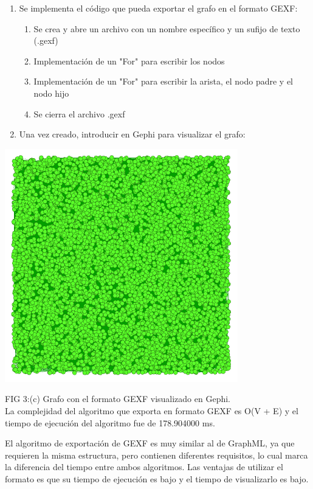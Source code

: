 \documentclass[book, 16 pt, conference]{ieeeconf}
\begin{document}
\begin{enumerate}
\item Se implementa el código que pueda exportar el grafo en el formato GEXF:
	\begin{enumerate}
	\item Se crea y abre un archivo con un nombre específico y un sufijo de texto (.gexf)
	\item Implementación de un "For" para escribir los nodos
	\item Implementación de un "For" para escribir la arista, el nodo padre y el nodo hijo
	\item Se cierra el archivo .gexf
	\end{enumerate}
\item Una vez creado, introducir en Gephi para visualizar el grafo: \\
\end{enumerate} 

\begin{center}
\includegraphics[scale=0.40]{3} 
\end{center}
FIG 3:(c) Grafo con el formato GEXF visualizado en Gephi.\\

La complejidad del algoritmo que exporta en formato GEXF es O(V + E) y el tiempo de ejecución del algoritmo fue de 178.904000 ms.

El algoritmo de exportación de GEXF es muy similar al de GraphML, ya que requieren la misma estructura, pero contienen diferentes requisitos, lo cual marca la diferencia del tiempo entre ambos algoritmos. Las ventajas de utilizar el formato es que su tiempo de ejecución es bajo y el tiempo de visualizarlo es bajo. 
\end{document}
